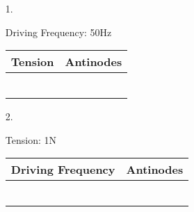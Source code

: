 \documentclass[10pt, letterpaper]{article}
\begin{document}
    \begin{itemize}
        \item [1.]\mbox{}
        
        \begin{center}
            Driving Frequency: 50Hz
    
            \begin{tabular}{| c | c |}
                \hline
                Tension & Antinodes     \\
                \hline
                &\\
                \hline
                &\\
                \hline
                &\\
                \hline
                &\\
                \hline
                &\\
                \hline
                &\\
                \hline
            \end{tabular}        
        \end{center}

        \item [2.]\mbox{}
        
        \begin{center}
            Tension: 1N
    
            \begin{tabular}{| c | c |}
                \hline
                Driving Frequency & Antinodes     \\
                \hline
                &\\
                \hline
                &\\
                \hline
                &\\
                \hline
                &\\
                \hline
                &\\
                \hline
                &\\
                \hline
            \end{tabular}        
        \end{center}
    \end{itemize}
    
\end{document}
